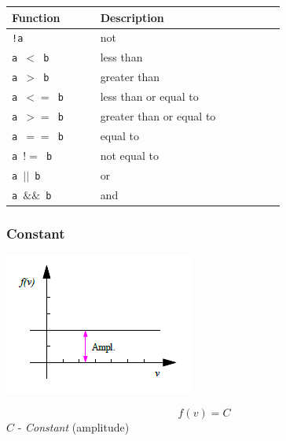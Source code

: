 \begin{center}
\vspace{0.3cm}
\begin{tabular}{|>{\raggedright} p{0.23\linewidth}| p{0.48\linewidth}|}
  \hline
  \rowcolor[HTML]{EFEFEF}
  Function & Description   \\
  \hline\hline
  {\tt !a} & not \\
  \hline
  {\tt a $<$ b} & less than  \\
  \hline
  {\tt a $>$ b} & greater than \\
  \hline
  {\tt a $<=$ b} & less than or equal to \\
  \hline
  {\tt a $>=$ b} & greater than or equal to \\
  \hline
  {\tt a $==$ b} & equal to \\
  \hline
  {\tt a $!=$ b} & not equal to \\
  \hline
  {\tt a $||$ b} & or \\
  \hline
  {\tt a $\&\&$ b} & and \\
\hline\end{tabular}
\end{center}

\subsubsection{Constant}

\noindent
\begin{minipage}{0.45\textwidth}
  \includegraphics[width=\textwidth]{Figures/4-Functions_constant}
\end{minipage}%
\hfill\begin{minipage}{0.4\textwidth}
  $$f(v) = C$$
  $C$ - {\sl Constant} (amplitude)
\end{minipage}

